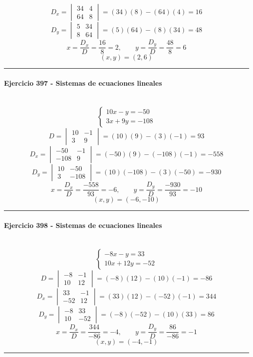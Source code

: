 \documentclass[10pt,a4paper]{article}
\newcommand{\res}[1]{\paragraph{#1}\mbox{}\\[-1.2em]}
\begin{document}
\[ D_x=\begin{vmatrix}34&4\\64&8\end{vmatrix}=(34)(8)-(64)(4)=16 \]
\[ D_y=\begin{vmatrix}5&34\\8&64\end{vmatrix}=(5)(64)-(8)(34)=48 \]
\[ x=\frac{D_x}{D}=\frac{16}{8}=2,\qquad y=\frac{D_y}{D}=\frac{48}{8}=6 \]
\[ \boxed{(x,y)=(2,6)} \]
\vspace{1mm}\hrule\vspace{2mm}
\res{Ejercicio 397 - Sistemas de ecuaciones lineales}
\[ \begin{cases}10 x - y=-50\\3 x + 9 y=-108\end{cases} \]
\[ D=\begin{vmatrix}10&-1\\3&9\end{vmatrix}=(10)(9)-(3)(-1)=93 \]
\[ D_x=\begin{vmatrix}-50&-1\\-108&9\end{vmatrix}=(-50)(9)-(-108)(-1)=-558 \]
\[ D_y=\begin{vmatrix}10&-50\\3&-108\end{vmatrix}=(10)(-108)-(3)(-50)=-930 \]
\[ x=\frac{D_x}{D}=\frac{-558}{93}=-6,\qquad y=\frac{D_y}{D}=\frac{-930}{93}=-10 \]
\[ \boxed{(x,y)=(-6,-10)} \]
\vspace{1mm}\hrule\vspace{2mm}
\res{Ejercicio 398 - Sistemas de ecuaciones lineales}
\[ \begin{cases}- 8 x - y=33\\10 x + 12 y=-52\end{cases} \]
\[ D=\begin{vmatrix}-8&-1\\10&12\end{vmatrix}=(-8)(12)-(10)(-1)=-86 \]
\[ D_x=\begin{vmatrix}33&-1\\-52&12\end{vmatrix}=(33)(12)-(-52)(-1)=344 \]
\[ D_y=\begin{vmatrix}-8&33\\10&-52\end{vmatrix}=(-8)(-52)-(10)(33)=86 \]
\[ x=\frac{D_x}{D}=\frac{344}{-86}=-4,\qquad y=\frac{D_y}{D}=\frac{86}{-86}=-1 \]
\[ \boxed{(x,y)=(-4,-1)} \]
\vspace{1mm}\hrule\vspace{2mm}
\end{document}
